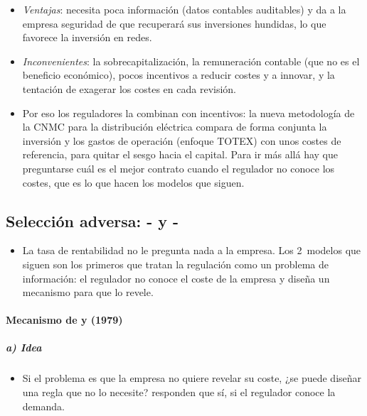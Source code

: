 \documentclass[11pt]{article}
\begin{document}
\begin{itemize}
\item \emph{Ventajas}: necesita poca información (datos contables auditables) y da a la empresa seguridad de que recuperará sus inversiones hundidas, lo que favorece la inversión en redes.
\item \emph{Inconvenientes}: la sobrecapitalización, la remuneración contable (que no es el beneficio económico), pocos incentivos a reducir costes y a innovar, y la tentación de exagerar los costes en cada revisión.
\item Por eso los reguladores la combinan con incentivos: la nueva metodología de la CNMC para la distribución eléctrica compara de forma conjunta la inversión y los gastos de operación (enfoque TOTEX) con unos costes de referencia, para quitar el sesgo hacia el capital\nocite{CNMC2025Circular8}. Para ir más allá hay que preguntarse cuál es el mejor contrato cuando el regulador no conoce los costes, que es lo que hacen los modelos que siguen.
\end{itemize}

\subsection{Selección adversa: - y -}\label{sec:seleccion-adversa-regulacion}

\begin{itemize}
\item La tasa de rentabilidad no le pregunta nada a la empresa. Los 2~modelos que siguen son los primeros que tratan la regulación como un problema de información: el regulador no conoce el coste de la empresa y diseña un mecanismo para que lo revele.
\end{itemize}

\paragraph{Mecanismo de  y  (1979)}

\subparagraph{a) Idea}

\begin{itemize}
\item Si el problema es que la empresa no quiere revelar su coste, ¿se puede diseñar una regla que no lo necesite? \textcite{LoebMagat1979Decentralized} responden que sí, si el regulador conoce la demanda.
\end{itemize}
\end{document}
